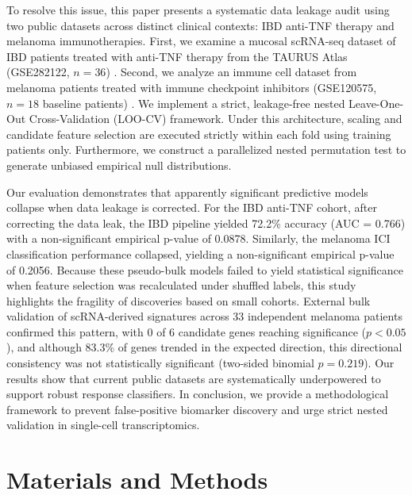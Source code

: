 \documentclass{bmcart}
\begin{document}
To resolve this issue, this paper presents a systematic data leakage audit using two public datasets across distinct clinical contexts: IBD anti-TNF therapy and melanoma immunotherapies. First, we examine a mucosal scRNA-seq dataset of IBD patients treated with anti-TNF therapy from the TAURUS Atlas (GSE282122, $n=36$) \cite{thomas}. Second, we analyze an immune cell dataset from melanoma patients treated with immune checkpoint inhibitors (GSE120575, $n=18$ baseline patients) \cite{sadefeldman}. We implement a strict, leakage-free nested Leave-One-Out Cross-Validation (LOO-CV) framework. Under this architecture, scaling and candidate feature selection are executed strictly within each fold using training patients only. Furthermore, we construct a parallelized nested permutation test to generate unbiased empirical null distributions.

Our evaluation demonstrates that apparently significant predictive models collapse when data leakage is corrected. For the IBD anti-TNF cohort, after correcting the data leak, the IBD pipeline yielded 72.2\% accuracy (AUC = 0.766) with a non-significant empirical p-value of 0.0878. Similarly, the melanoma ICI classification performance collapsed, yielding a non-significant empirical p-value of 0.2056. Because these pseudo-bulk models failed to yield statistical significance when feature selection was recalculated under shuffled labels, this study highlights the fragility of discoveries based on small cohorts. External bulk validation of scRNA-derived signatures across 33 independent melanoma patients confirmed this pattern, with 0 of 6 candidate genes reaching significance ($p<0.05$), and although 83.3\% of genes trended in the expected direction, this directional consistency was not statistically significant (two-sided binomial $p = 0.219$). Our results show that current public datasets are systematically underpowered to support robust response classifiers. In conclusion, we provide a methodological framework to prevent false-positive biomarker discovery and urge strict nested validation in single-cell transcriptomics.

\section*{Materials and Methods}
\end{document}
